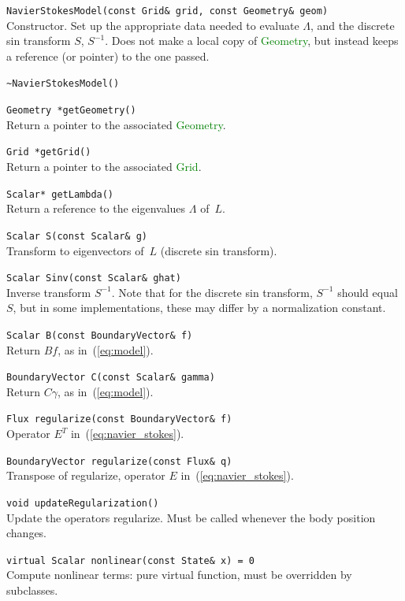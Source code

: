 \documentclass[11pt]{article}
\def\class#1{\textcolor{green}{\ttfamily\small #1}} %
\def\fn#1{{\ttfamily\small #1}} %
\let\code\lstinline
\begin{document}
\begin{description}
	\item \code|NavierStokesModel(const Grid& grid, const Geometry& geom)|\\
		Constructor.  Set up the appropriate data needed to evaluate $\Lambda$, and the discrete sin transform $S$, $S^{-1}$.  Does not make a local copy of \class{Geometry}, but instead keeps a reference (or pointer) to the one passed.
	\item \code|~NavierStokesModel()|\\
	\item \code|Geometry *getGeometry()|\\
		Return a pointer to the associated \class{Geometry}.
	\item \code|Grid *getGrid()|\\
		Return a pointer to the associated \class{Grid}.
	\item \code|Scalar* getLambda()|\\
		Return a reference to the eigenvalues $\Lambda$ of~$L$.
	\item \code|Scalar S(const Scalar& g)|\\
		Transform to eigenvectors of~$L$ (discrete sin transform).
	\item \code|Scalar Sinv(const Scalar& ghat)|\\
		Inverse transform $S^{-1}$.  Note that for the discrete sin transform, $S^{-1}$ should equal~$S$, but in some implementations, these may differ by a normalization constant.
	\item \code|Scalar B(const BoundaryVector& f)|\\
		Return $Bf$, as in~(\ref{eq:model}).
	\item \code|BoundaryVector C(const Scalar& gamma)|\\
		Return $C\gamma$, as in~(\ref{eq:model}).
	\item \code|Flux regularize(const BoundaryVector& f)|\\
		Operator $E^T$ in~(\ref{eq:navier_stokes}).
	\item \code|BoundaryVector regularize(const Flux& q)|\\
		Transpose of regularize, operator $E$ in~(\ref{eq:navier_stokes}).
	\item \code|void updateRegularization()|\\
		Update the operators \fn{regularize}.  Must be called whenever the body position changes.
	\item \code|virtual Scalar nonlinear(const State& x) = 0|\\
		Compute nonlinear terms: pure virtual function, must be overridden by subclasses. 
\end{description}
\end{document}
